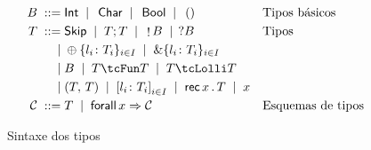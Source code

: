 
\begin{figure}[t]
  \begin{align*}
    \tcBase \grmeq & \inte \grmor \, \chare \grmor \, \boole \grmor \, \unite && \text{Tipos básicos}\\
    T \grmeq       & \tskip \grmor \tSemi{T}{T} \grmor \,\tOut{\tcBase} \grmor \,\tIn{\tcBase} && \text{Tipos}\\
    \grmor         & \tIChoice\{l_i\colon T_i\}_{i\in I} \grmor \tEChoice\{l_i\colon T_i\}_{i\in I} \\ 
    \grmor         & \tcBase \grmor \tUnFun{T}{T} \grmor \tLinFun{T}{T}\\   
    \grmor         & \tPair{T}{T} \grmor \tDatatype{l_i\colon T_i}_{i\in I} \grmor \tRec{x}{T} \grmor x\\
    \kindsch \grmeq & T \grmor \tForall{x}{\kindsch}  && \text{Esquemas de tipos}
  \end{align*}
  \hrulefill
  \caption{Sintaxe dos tipos}
  \label{fig:types}
\end{figure}


